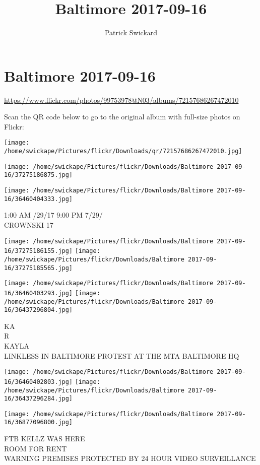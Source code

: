 \documentclass[10pt,letterpaper]{article}
\title{Baltimore 2017-09-16}
\author{Patrick Swickard}
\date{}
\begin{document}
\section*{Baltimore 2017-09-16}

\url{https://www.flickr.com/photos/99753978@N03/albums/72157686267472010}

Scan the QR code below to go to the original album with full-size photos on Flickr:

\texttt{[image: /home/swickape/Pictures/flickr/Downloads/qr/72157686267472010.jpg]}
\pagebreak

\texttt{[image: /home/swickape/Pictures/flickr/Downloads/Baltimore 2017-09-16/37275186875.jpg]}

\vspace{0.25in}
\texttt{[image: /home/swickape/Pictures/flickr/Downloads/Baltimore 2017-09-16/36460404333.jpg]}

1:00 AM /29/17 9:00 PM 7/29/\\
CROWNSKI 17
\pagebreak

\texttt{[image: /home/swickape/Pictures/flickr/Downloads/Baltimore 2017-09-16/37275186155.jpg]}
\texttt{[image: /home/swickape/Pictures/flickr/Downloads/Baltimore 2017-09-16/37275185565.jpg]}

\texttt{[image: /home/swickape/Pictures/flickr/Downloads/Baltimore 2017-09-16/36460403293.jpg]}
\texttt{[image: /home/swickape/Pictures/flickr/Downloads/Baltimore 2017-09-16/36437296804.jpg]}

KA\\
R\\
KAYLA\\
LINKLESS IN BALTIMORE PROTEST AT THE MTA BALTIMORE HQ
\pagebreak

\texttt{[image: /home/swickape/Pictures/flickr/Downloads/Baltimore 2017-09-16/36460402803.jpg]}
\texttt{[image: /home/swickape/Pictures/flickr/Downloads/Baltimore 2017-09-16/36437296284.jpg]}

\vspace{0.25in}
\texttt{[image: /home/swickape/Pictures/flickr/Downloads/Baltimore 2017-09-16/36877096800.jpg]}

FTB KELLZ WAS HERE\\
ROOM FOR RENT\\
WARNING PREMISES PROTECTED BY 24 HOUR VIDEO SURVEILLANCE
\pagebreak
\end{document}
